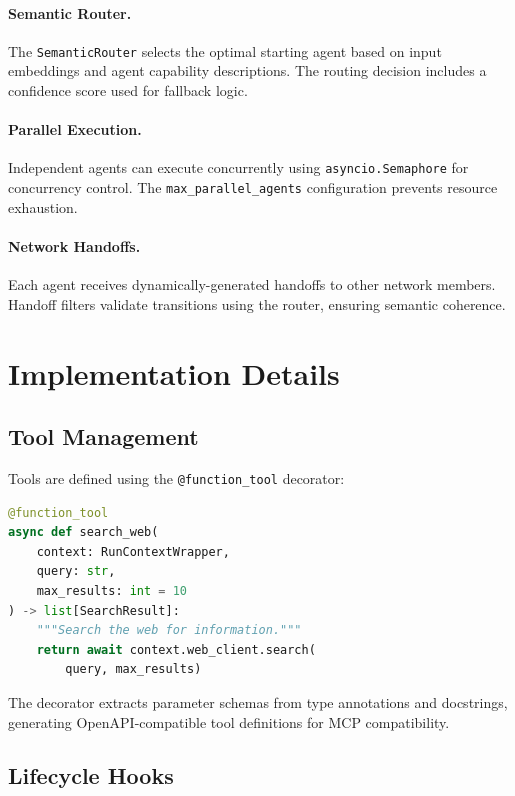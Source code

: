 \documentclass[11pt,twocolumn]{article}
\begin{document}
\paragraph{Semantic Router.} The \texttt{SemanticRouter} selects the optimal starting agent based on input embeddings and agent capability descriptions. The routing decision includes a confidence score used for fallback logic.

\paragraph{Parallel Execution.} Independent agents can execute concurrently using \texttt{asyncio.Semaphore} for concurrency control. The \texttt{max\_parallel\_agents} configuration prevents resource exhaustion.

\paragraph{Network Handoffs.} Each agent receives dynamically-generated handoffs to other network members. Handoff filters validate transitions using the router, ensuring semantic coherence.

\section{Implementation Details}

\subsection{Tool Management}

Tools are defined using the \texttt{@function\_tool} decorator:

\begin{lstlisting}[language=Python]
@function_tool
async def search_web(
    context: RunContextWrapper,
    query: str,
    max_results: int = 10
) -> list[SearchResult]:
    """Search the web for information."""
    return await context.web_client.search(
        query, max_results)
\end{lstlisting}

The decorator extracts parameter schemas from type annotations and docstrings, generating OpenAPI-compatible tool definitions for MCP compatibility.

\subsection{Lifecycle Hooks}
\end{document}
